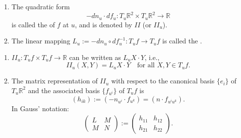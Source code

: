 \begin{enumerate}
\item[i)] The quadratic form
$$-dn_u \cdot df_u : T_u \mathbb{R}^2 \times T_u \mathbb{R}^2 \rightarrow \mathbb{R}$$
is called the  of $f$ at $u$, and is denoted by $II$ (or $II_u$).

\item[ii)] The linear mapping $L_u := -dn_u \circ df_u^{-1} : T_u f \rightarrow T_u f$ is called the .
\end{enumerate}

\begin{enumerate}
\item[1.] $II_u : T_u f \times T_u f \rightarrow \mathbb{R}$ can be written as $L_u X \cdot Y$, i.e.,
$$II_u(X, Y) = L_u X \cdot Y \quad \text{for all } X, Y \in T_u f.$$

\item[2.] The matrix representation of $II_u$ with respect to the canonical basis $\{e_i\}$ of $T_u \mathbb{R}^2$ and the associated basis $\{f_{u^i}\}$ of $T_u f$ is
$$(h_{ik}) := (-n_{u^i} \cdot f_{u^k}) = (n \cdot f_{u^i u^k}).$$
In Gauss' notation:
$$\begin{pmatrix} L & M \\ M & N \end{pmatrix} := \begin{pmatrix} h_{11} & h_{12} \\ h_{21} & h_{22} \end{pmatrix}.$$
\end{enumerate}